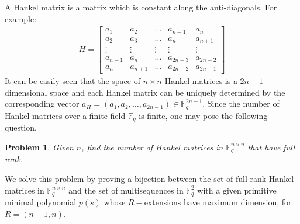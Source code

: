 \documentclass[letterpaper, 12 pt]{article}  \usepackage{amssymb}
\newtheorem{problem}{Problem}
\newcommand{\F}{\mathbb{F}}
\begin{document}
A Hankel matrix is a matrix which is constant along the anti-diagonals. For
example:
\begin{eqnarray}
\label{Hankel}
 H = \left[\begin{matrix}
   a_1 & a_{2} &  \ldots & a_{n-1}& a_n\\
   a_2 & a_3   &  \ldots & a_n & a_{n+1}\\
  \vdots & \vdots & \vdots & \vdots & \vdots \\
   a_{n-1} & a_{n} &  \ldots &  a_{2n-3}& a_{2n-2}\\
   a_n & a_{n+1} &  \ldots &  a_{2n-2}& a_{2n-1}
 \end{matrix}\right]
\end{eqnarray}
 It can be easily seen that the space of $n \times n$ Hankel matrices is a
$2n-1$ dimensional space and each Hankel matrix can be uniquely determined by
the corresponding vector $a_H = (a_1,a_2,\ldots,a_{2n-1}) \in \F_q^{2n-1}$. 
Since the number of Hankel matrices over a finite field $\F_q$ is finite, one
may pose the following question.

\begin{problem}
Given $n$, find the number of Hankel matrices in $\F_q^{n \times n}$ that
have full rank.
\end{problem}

We solve this problem by proving a bijection between the set of full rank
Hankel matrices in $\F_q^{n \times n}$ and the set of multisequences in $\F_q^2$
with a given primitive minimal polynomial $p(s)$ whose $R-$extensions have
maximum dimension, for $R= (n-1,n)$.
\end{document}
